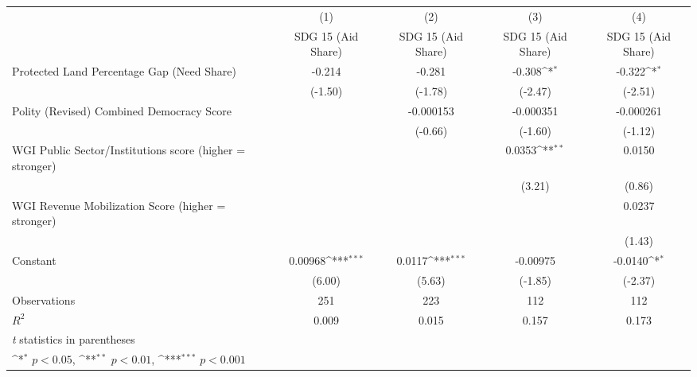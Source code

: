 {
\def\sym#1{\ifmmode^{#1}\else\(^{#1}\)\fi}
\begin{tabular}{l*{4}{c}}
\hline\hline
                &\multicolumn{1}{c}{(1)}&\multicolumn{1}{c}{(2)}&\multicolumn{1}{c}{(3)}&\multicolumn{1}{c}{(4)}\\
                &\multicolumn{1}{c}{SDG 15 (Aid Share)}&\multicolumn{1}{c}{SDG 15 (Aid Share)}&\multicolumn{1}{c}{SDG 15 (Aid Share)}&\multicolumn{1}{c}{SDG 15 (Aid Share)}\\
\hline
Protected Land Percentage Gap (Need Share)&   -0.214         &   -0.281         &   -0.308\sym{*}  &   -0.322\sym{*}  \\
                &  (-1.50)         &  (-1.78)         &  (-2.47)         &  (-2.51)         \\
[1em]
Polity (Revised) Combined Democracy Score&                  &-0.000153         &-0.000351         &-0.000261         \\
                &                  &  (-0.66)         &  (-1.60)         &  (-1.12)         \\
[1em]
WGI Public Sector/Institutions score (higher = stronger)&                  &                  &   0.0353\sym{**} &   0.0150         \\
                &                  &                  &   (3.21)         &   (0.86)         \\
[1em]
WGI Revenue Mobilization Score (higher = stronger)&                  &                  &                  &   0.0237         \\
                &                  &                  &                  &   (1.43)         \\
[1em]
Constant        &  0.00968\sym{***}&   0.0117\sym{***}& -0.00975         &  -0.0140\sym{*}  \\
                &   (6.00)         &   (5.63)         &  (-1.85)         &  (-2.37)         \\
\hline
Observations    &      251         &      223         &      112         &      112         \\
\(R^{2}\)       &    0.009         &    0.015         &    0.157         &    0.173         \\
\hline\hline
\multicolumn{5}{l}{\footnotesize \textit{t} statistics in parentheses}\\
\multicolumn{5}{l}{\footnotesize \sym{*} \(p<0.05\), \sym{**} \(p<0.01\), \sym{***} \(p<0.001\)}\\
\end{tabular}
}
